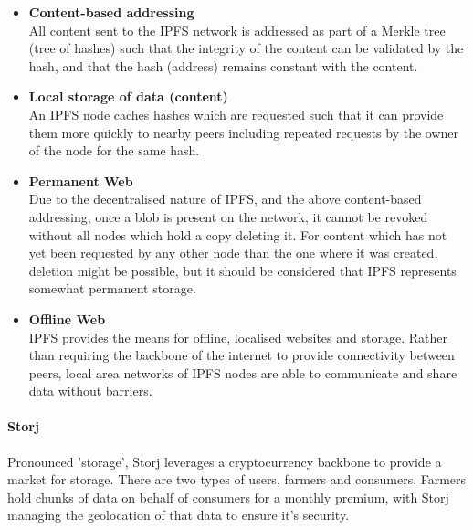 \begin{itemize}
	\item
    	\textbf{Content-based addressing} \\
        All content sent to the IPFS network is addressed as part of a Merkle tree (tree of hashes) such that the integrity of the content can be validated by the hash, and that the hash (address) remains constant with the content.
    \item
    	\textbf{Local storage of data (content)} \\
        An IPFS node caches hashes which are requested such that it can provide them more quickly to nearby peers including repeated requests by the owner of the node for the same hash.
    \item
    	\textbf{Permanent Web} \\
        Due to the decentralised nature of IPFS, and the above content-based addressing, once a blob is present on the network, it cannot be revoked without all nodes which hold a copy deleting it. For content which has not yet been requested by any other node than the one where it was created, deletion might be possible, but it should be considered that IPFS represents somewhat permanent storage.
    \item
    	\textbf{Offline Web} \\
        IPFS provides the means for offline, localised websites and storage. Rather than requiring the backbone of the internet to provide connectivity between peers, local area networks of IPFS nodes are able to communicate and share data without barriers.
\end{itemize}

\paragraph{Storj}

Pronounced 'storage', Storj leverages a cryptocurrency backbone to provide a market for storage. There are two types of users, farmers and consumers. Farmers hold chunks of data on behalf of consumers for a monthly premium, with Storj managing the geolocation of that data to ensure it's security.

